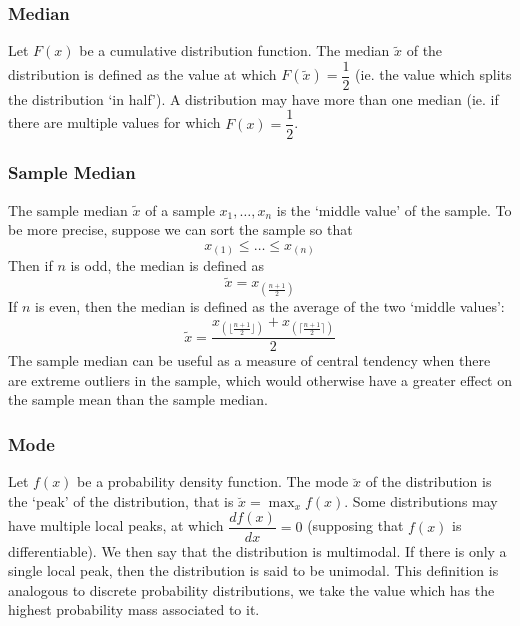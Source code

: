 \documentclass[11pt]{report} %
\begin{document}
\subsubsection{Median}

Let $F\left(x\right)$ be a cumulative distribution function. The median $\widetilde{x}$ of the distribution is defined as the value at which $F\left(\widetilde{x}\right) = \dfrac{1}{2}$ (ie. the value which splits the distribution `in half'). A distribution may have more than one median (ie. if there are multiple values for which $F\left(x\right) = \dfrac{1}{2}$.

\subsubsection{Sample Median}

The sample median $\widetilde{x}$ of a sample $x_{1}, \dots, x_{n}$ is the `middle value' of the sample. To be more precise, suppose we can sort the sample so that
\begin{equation}
x_{\left(1\right)} \leq \dots \leq x_{\left(n\right)}
\end{equation}
Then if $n$ is odd, the median is defined as
\begin{equation}
\widetilde{x} = x_{\left(\frac{n + 1}{2}\right)}
\end{equation}
If $n$ is even, then the median is defined as the average of the two `middle values':
\begin{equation}
\widetilde{x} = \dfrac{x_{\left(\lfloor\frac{n + 1}{2}\rfloor\right)} + x_{\left(\lceil\frac{n + 1}{2}\rceil\right)}}{2}
\end{equation}
The sample median can be useful as a measure of central tendency when there are extreme outliers in the sample, which would otherwise have a greater effect on the sample mean than the sample median.

\subsubsection{Mode}

Let $f\left(x\right)$ be a probability density function. The mode $\breve{x}$ of the distribution is the `peak' of the distribution, that is $\breve{x} = \max_{x}f\left(x\right)$. Some distributions may have multiple local peaks, at which $\dfrac{df\left(x\right)}{dx} = 0$ (supposing that $f\left(x\right)$ is differentiable). We then say that the distribution is multimodal. If there is only a single local peak, then the distribution is said to be unimodal. This definition is analogous to discrete probability distributions, we take the value which has the highest probability mass associated to it.
\end{document}
